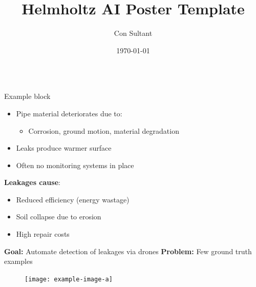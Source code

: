 \documentclass[aspectratio=1610]{beamer}
\title{Helmholtz AI Poster Template}
\author{Con Sultant}
\institute[Helmholtz AI]
  {Helmholtz AI, Germany}
\date{\today}
\begin{document}
\begin{frame}{}
    \vspace{-3ex}
    
    \begin{columns}[t]
        \begin{column}{.5\linewidth}
        
            \begin{haiblock}{Example block}


                \vspace{0.5em}
                \begin{itemize}
                \item Pipe material deteriorates due to:
                \begin{itemize}
                    \item Corrosion, ground motion, material degradation
                \end{itemize}
                \item Leaks produce warmer surface
                \item Often no monitoring systems in place
                \end{itemize}

                \vspace{0.5em}
                \textbf{Leakages cause}:
                \begin{itemize}
                    \item Reduced efficiency (energy wastage)
                    \item Soil collapse due to erosion
                    \item High repair costs
                \end{itemize}
                
                \vspace{0.5em}
                \textbf{Goal:} Automate detection of leakages via drones
                \textbf{Problem:} Few ground truth examples

                \begin{figure}
                    \centering
                    \texttt{[image: example-image-a]}
                \end{figure}
                
            \end{haiblock}
            

\end{column}
\end{columns}
\end{frame}
\end{document}
